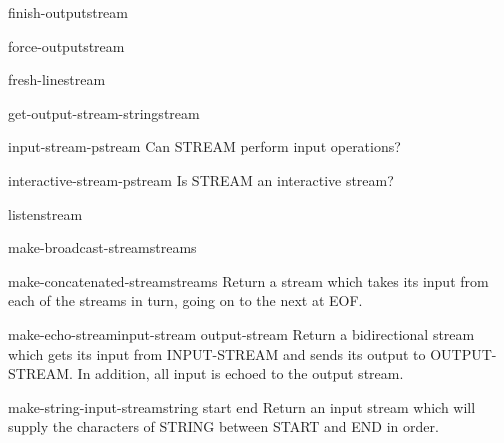 \begin{function}{finish-output}{\op stream}{}{}
  
\end{function}

\begin{function}{force-output}{\op stream}{}{}
  
\end{function}

\begin{function}{fresh-line}{\op stream}{}{}
  
\end{function}

\begin{function}{get-output-stream-string}{stream}{}{}
  
\end{function}

\begin{function}{input-stream-p}{stream}{}{}
  Can STREAM perform input operations?
\end{function}

\begin{function}{interactive-stream-p}{stream}{}{}
  Is STREAM an interactive stream?
\end{function}

\begin{function}{listen}{\op stream}{}{}
  
\end{function}

\begin{function}{make-broadcast-stream}{\rest streams}{}{}
  
\end{function}

\begin{function}{make-concatenated-stream}{\rest streams}{}{}
  Return a stream which takes its input from each of the streams in turn,
   going on to the next at EOF.
\end{function}

\begin{function}{make-echo-stream}{input-stream output-stream}{}{}
  Return a bidirectional stream which gets its input from INPUT-STREAM and
   sends its output to OUTPUT-STREAM. In addition, all input is echoed to
   the output stream.
\end{function}

\begin{function}{make-string-input-stream}{string \op start end}{}{}
  Return an input stream which will supply the characters of STRING between
  START and END in order.
\end{function}

